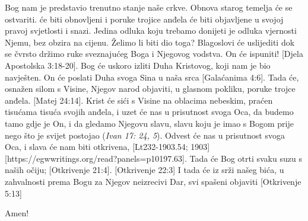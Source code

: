 Bog nam je predstavio trenutno stanje naše crkve. Obnova starog temelja će se ostvariti.  će biti obnovljeni i poruke trojice anđela će biti objavljene u svojoj pravoj svjetlosti i snazi. Jedina odluka koju trebamo donijeti je odluka vjernosti Njemu, bez obzira na cijenu. Želimo li biti dio toga? Blagoslovi će uslijediti dok se čvrsto držimo ruke sveznajućeg Boga i Njegovog vodstva.  On će ispuniti! [Djela Apostolska 3:18-20]. Bog će uskoro izliti Duha Kristovog, koji nam je bio navješten. On će poslati Duha svoga Sina u naša srca [Galaćanima 4:6]. Tada će, osnažen silom s Visine, Njegov narod objaviti, u glasnom pokliku, poruke trojce anđela. [Matej 24:14]. Krist će sići s Visine na oblacima nebeskim, praćen tisućama tisuća svojih anđela, i uzet će nas u prisutnost svoga Oca, da budemo tamo gdje je On, i da gledamo Njegovu slavu, slavu koju je imao s Bogom prije nego što je svijet postojao (\textit{Ivan 17: 24, 5}). Odvest će nas u prisutnost svoga Oca, i slava će nam biti otkrivena, [Lt232-1903.54; 1903][https://egwwritings.org/read?panels=p10197.63]. Tada će Bog otrti svaku suzu s naših očiju; [Otkrivenje 21:4]. [Otkrivenje 22:3] I tada će iz srži našeg bića, u zahvalnosti prema Bogu za Njegov neizrecivi Dar, svi spašeni  objaviti [Otkrivenje 5:13]

Amen!
